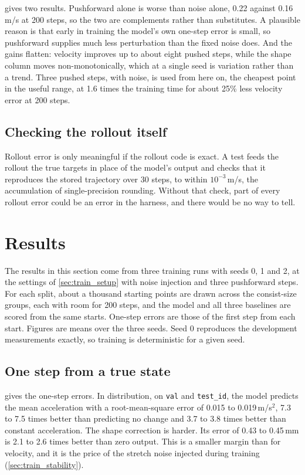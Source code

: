  gives two results. Pushforward alone is worse than noise alone, 0.22 against 0.16\,m/s at 200 steps, so the two are complements rather than substitutes. A plausible reason is that early in training the model's own one-step error is small, so pushforward supplies much less perturbation than the fixed noise does. And the gains flatten: velocity improves up to about eight pushed steps, while the shape column moves non-monotonically, which at a single seed is variation rather than a trend. Three pushed steps, with noise, is used from here on, the cheapest point in the useful range, at 1.6 times the training time for about 25\% less velocity error at 200 steps.

\subsection{Checking the rollout itself}

Rollout error is only meaningful if the rollout code is exact. A test feeds the rollout the true targets in place of the model's output and checks that it reproduces the stored trajectory over 30 steps, to within $10^{-3}$\,m/s, the accumulation of single-precision rounding. Without that check, part of every rollout error could be an error in the harness, and there would be no way to tell.

\section{Results}
\label{sec:train_results}

The results in this section come from three training runs with seeds 0, 1 and 2, at the settings of \cref{sec:train_setup} with noise injection and three pushforward steps. For each split, about a thousand starting points are drawn across the consist-size groups, each with room for 200 steps, and the model and all three baselines are scored from the same starts. One-step errors are those of the first step from each start. Figures are means over the three seeds. Seed 0 reproduces the development measurements exactly, so training is deterministic for a given seed.

\subsection{One step from a true state}

 gives the one-step errors. In distribution, on \texttt{val} and \texttt{test\_id}, the model predicts the mean acceleration with a root-mean-square error of 0.015 to 0.019\,m/s$^2$, 7.3 to 7.5 times better than predicting no change and 3.7 to 3.8 times better than constant acceleration. The shape correction is harder. Its error of 0.43 to 0.45\,mm is 2.1 to 2.6 times better than zero output. This is a smaller margin than for velocity, and it is the price of the stretch noise injected during training (\cref{sec:train_stability}).

